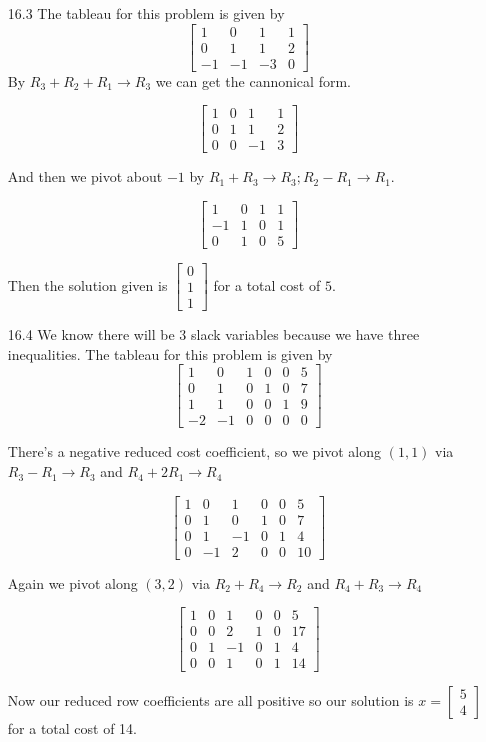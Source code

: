 \documentclass[10pt,a4paper]{article}
\newcommand\m[1]{\begin{bmatrix}#1\end{bmatrix}}
\begin{document}
\begin{enumerate}
\begin{enumerate}
    \end{enumerate}

    \item [16.3] 
        The tableau for this problem is given by $$\m{1 & 0 & 1 & 1 \\ 0 & 1 &1 & 2 \\ -1 & -1 & -3 & 0}$$
        By $R_3 + R_2 + R_1 \rightarrow R_3$ we can get the cannonical form.

        $$\m{1 & 0 & 1 & 1 \\ 0 & 1 &1 & 2 \\ 0 & 0 & -1 & 3}$$

        And then we pivot about $-1$ by $R_1 + R_3 \rightarrow R_3; R_2 - R_1 \rightarrow R_1$. 

        $$\m{1 & 0 & 1 & 1 \\ -1 & 1 & 0 & 1 \\ 0 & 1 & 0 & 5}$$

        Then the solution given is $\m{ 0 \\ 1 \\ 1}$ for a total cost of $5$.

    \item [16.4]
        We know there will be $3$ slack variables because we have three inequalities.
        The tableau for this problem is given by 
        $$\m{1 & 0 & 1 & 0 & 0 & 5 \\ 0 & 1 & 0 & 1 & 0 & 7 \\ 1 & 1 & 0 & 0 & 1 & 9\\ -2 & -1 & 0 &0 &0& 0  }$$

        There's a negative reduced cost coefficient, so we pivot along $(1, 1)$ via $R_3 -R_1 \rightarrow R_3$ and $R_4 + 2R_1 \rightarrow R_4$

        $$\m{1 & 0 & 1 & 0 & 0 & 5 \\ 0 & 1 & 0 & 1 & 0 & 7 \\ 0 & 1 & -1 & 0 & 1 & 4\\ 0 & -1 & 2 &0 &0& 10  }$$

        Again we pivot along $(3, 2)$ via $R_2 + R_4 \rightarrow R_2$ and $R_4 + R_3 \rightarrow R_4$

        $$\m{1 & 0 & 1 & 0 & 0 & 5 \\ 0 & 0 & 2 & 1 & 0 & 17 \\ 0 & 1 & -1 & 0 & 1 & 4\\ 0 & 0 & 1 &0 &1& 14  }$$

        Now our reduced row coefficients are all positive so our solution is $x = \m{5 \\ 4}$ for a total cost of 14.


\end{enumerate}
\end{document}
